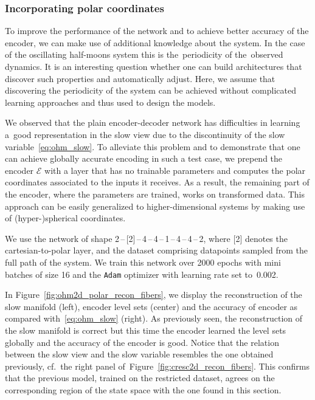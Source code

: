 \documentclass{article}
\let\oldtodo\todo
\renewcommand{\todo}[1]{\oldtodo[size=\footnotesize,color=mplorange!40]{#1}}
\newcommand{\enc}{\mathcal{E}} %
\begin{document}

\subsubsection{Incorporating polar coordinates}\label{sec:ohm_polar}
To improve the performance of the network and to achieve better accuracy of the encoder, we can make use of additional knowledge about the system. In the case of the oscillating half-moons system this is the~periodicity of the~observed dynamics. It is an interesting question whether one can build architectures that discover such properties and automatically adjust. Here, we assume that discovering the periodicity of the system can be achieved without complicated learning approaches and thus used to design the models.

We observed that the plain encoder-decoder network has difficulties in learning a~good representation in the slow view due to the discontinuity of the slow variable~\eqref{eq:ohm_slow}. To alleviate this problem and to demonstrate that one can achieve globally accurate encoding in such a test case, we prepend the encoder $\enc$ with a layer that has no trainable parameters and computes the polar coordinates associated to the inputs it receives. As a result, the remaining part of the encoder, where the parameters are trained, works on transformed data. This approach can be easily generalized to higher-dimensional systems by making use of (hyper-)spherical coordinates.

We use the network of shape 2\,--\,[2]\,--\,4\,--\,4\,--\,1\,--\,4\,--\,4\,--\,2, where [2] denotes the cartesian-to-polar layer, and the dataset comprising datapoints sampled from the full path of the system. We train this network over 2000 epochs with mini batches of size 16 and the \texttt{Adam} optimizer with learning rate set to~0.002.

In Figure~\ref{fig:ohm2d_polar_recon_fibers}, we display the reconstruction of the slow manifold (left), encoder level sets (center) and the accuracy of encoder as compared with~\eqref{eq:ohm_slow} (right). As previously seen, the reconstruction of the slow manifold is correct but this time the encoder learned the level sets globally and the accuracy of the encoder is good. Notice that the relation between the slow view and the slow variable resembles the one obtained previously, cf.~the right panel of~Figure~\ref{fig:cresc2d_recon_fibers}. This confirms that the previous model, trained on the restricted dataset, agrees on the corresponding region of the state space with the one found in this section.
\end{document}
